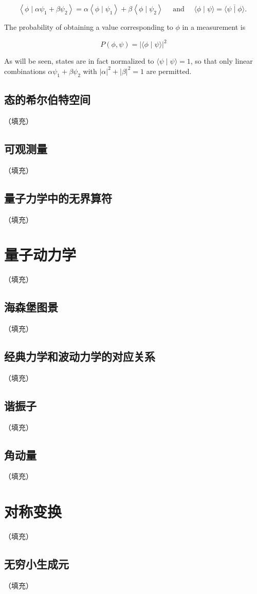 \documentclass[hyperref,UTF8]{ctexbook}
\begin{document}
$$
\left\langle\phi \mid \alpha \psi_{1}+\beta \psi_{2}\right\rangle=\alpha\left\langle\phi \mid \psi_{1}\right\rangle+\beta\left\langle\phi \mid \psi_{2}\right\rangle \quad \text { and } \quad\langle\phi \mid \psi\rangle=\overline{\langle\psi \mid \phi\rangle} \text {. }
$$

The probability of obtaining a value corresponding to $\phi$ in a measurement is

$$
P(\phi, \psi)=|\langle\phi \mid \psi\rangle|^{2}
$$

As will be seen, states are in fact normalized to $\langle\psi \mid \psi\rangle=1$, so that only linear combinations $\alpha \psi_{1}+\beta \psi_{2}$ with $|\alpha|^{2}+|\beta|^{2}=1$ are permitted.

\subsection{态的希尔伯特空间}（填充）
\subsection{可观测量}（填充）
\subsection{量子力学中的无界算符}（填充）
\section{量子动力学}（填充）
\subsection{海森堡图景}（填充）
\subsection{经典力学和波动力学的对应关系}（填充）
\subsection{谐振子}（填充）
\subsection{角动量}（填充）
\section{对称变换}（填充）
\subsection{无穷小生成元}（填充）
\end{document}
